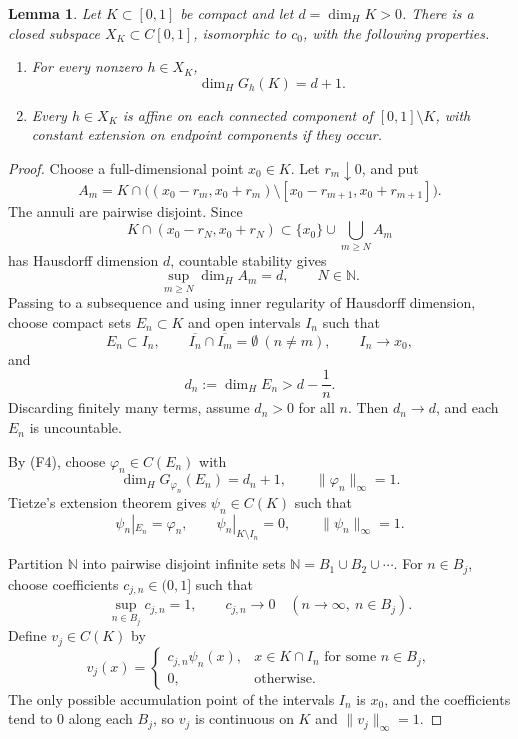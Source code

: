 \documentclass[11pt]{article}
\newtheorem*{lemma}{Lemma}
\newcommand{\NN}{\mathbb N}
\newcommand{\dimH}{\dim_{\!H}}
\begin{document}
\begin{lemma}\label{lem:c0-compact}
Let \(K\subset[0,1]\) be compact and let \(d=\dimH K>0\).  There is a closed
subspace \(X_K\subset C[0,1]\), isomorphic to \(c_0\), with the following
properties.
\begin{enumerate}[label=(\roman*),leftmargin=*]
\item For every nonzero \(h\in X_K\),
\[
\dimH G_h(K)=d+1.
\]
\item Every \(h\in X_K\) is affine on each connected component of
\([0,1]\setminus K\), with constant extension on endpoint components if they
occur.
\end{enumerate}
\end{lemma}

\begin{proof}
Choose a full-dimensional point \(x_0\in K\).  Let \(r_m\downarrow0\), and put
\[
A_m=K\cap\bigl((x_0-r_m,x_0+r_m)\setminus [x_0-r_{m+1},x_0+r_{m+1}]\bigr).
\]
The annuli are pairwise disjoint.  Since
\[
K\cap(x_0-r_N,x_0+r_N)\subset \{x_0\}\cup\bigcup_{m\geq N} A_m
\]
has Hausdorff dimension \(d\), countable stability gives
\[
\sup_{m\geq N}\dimH A_m=d,\qquad N\in\NN.
\]
Passing to a subsequence and using inner regularity of Hausdorff dimension,
choose compact sets \(E_n\subset K\) and open intervals \(I_n\) such that
\[
E_n\subset I_n,\qquad
\overline{I_n}\cap\overline{I_m}=\emptyset\ (n\neq m),\qquad
I_n\to x_0,
\]
and
\[
d_n:=\dimH E_n>d-\frac1n.
\]
Discarding finitely many terms, assume \(d_n>0\) for all \(n\).  Then
\(d_n\to d\), and each \(E_n\) is uncountable.

By (F4), choose \(\varphi_n\in C(E_n)\) with
\[
\dimH G_{\varphi_n}(E_n)=d_n+1,
\qquad
\|\varphi_n\|_\infty=1.
\]
Tietze's extension theorem gives \(\psi_n\in C(K)\) such that
\[
\psi_n|_{E_n}=\varphi_n,\qquad
\psi_n|_{K\setminus I_n}=0,\qquad
\|\psi_n\|_\infty=1.
\]

Partition \(\NN\) into pairwise disjoint infinite sets
\(\NN=B_1\cup B_2\cup\cdots\).  For \(n\in B_j\), choose coefficients
\(c_{j,n}\in(0,1]\) such that
\[
\sup_{n\in B_j}c_{j,n}=1,
\qquad
c_{j,n}\to0 \quad(n\to\infty,\ n\in B_j).
\]
Define \(v_j\in C(K)\) by
\[
v_j(x)=
\begin{cases}
c_{j,n}\psi_n(x),& x\in K\cap I_n\text{ for some }n\in B_j,\\
0,&\text{otherwise}.
\end{cases}
\]
The only possible accumulation point of the intervals \(I_n\) is \(x_0\), and
the coefficients tend to \(0\) along each \(B_j\), so \(v_j\) is continuous on
\(K\) and \(\|v_j\|_\infty=1\).


\end{proof}
\end{document}
